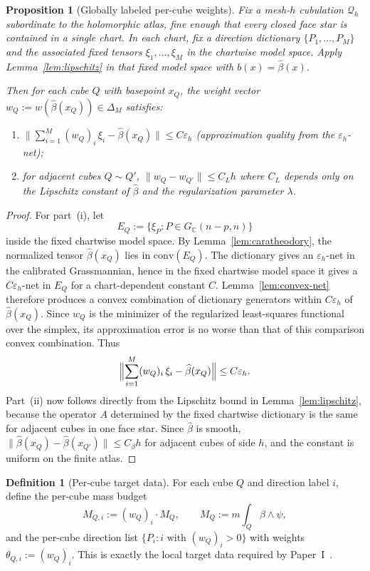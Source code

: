 \documentclass[11pt]{article}
\numberwithin{equation}{section}
\theoremstyle{plain}
\newtheorem{proposition}[theorem]{Proposition}
\theoremstyle{definition}
\newtheorem{definition}[theorem]{Definition}
\theoremstyle{remark}
\newcommand{\C}{\mathbb{C}}
\newcommand{\eps}{\varepsilon}
\newcommand{\calQ}{\mathcal{Q}}
\begin{document}
\begin{proposition}[Globally labeled per-cube weights]\label{prop:global-weights}
Fix a mesh-$h$ cubulation $\calQ_h$ subordinate to the holomorphic atlas, fine enough that every closed face star is contained in a single chart.  In each chart, fix a direction dictionary $\{P_1,\dots,P_M\}$ and the associated fixed tensors $\xi_1,\dots,\xi_M$ in the chartwise model space.  Apply Lemma~\ref{lem:lipschitz} in that fixed model space with $b(x)=\widehat\beta(x)$.

Then for each cube $Q$ with basepoint $x_Q$, the weight vector $w_Q:=w(\widehat\beta(x_Q))\in\Delta_M$ satisfies:
\begin{enumerate}
\item[\textnormal{(i)}] $\|\sum_{i=1}^M (w_Q)_i\,\xi_i-\widehat\beta(x_Q)\|\le C\eps_h$ (approximation quality from the $\eps_h$-net);
\item[\textnormal{(ii)}] for adjacent cubes $Q\sim Q'$, $\|w_Q-w_{Q'}\|\le C_L h$ where $C_L$ depends only on the Lipschitz constant of $\widehat\beta$ and the regularization parameter $\lambda$.
\end{enumerate}
\end{proposition}

\begin{proof}
For part~(i), let
\[
E_Q:=\{\xi_P:P\in G_\C(n-p,n)\}
\]
inside the fixed chartwise model space.
By Lemma~\ref{lem:caratheodory}, the normalized tensor $\widehat\beta(x_Q)$ lies in $\mathrm{conv}(E_Q)$.  The dictionary gives an $\eps_h$-net in the calibrated Grassmannian, hence in the fixed chartwise model space it gives a $C\eps_h$-net in $E_Q$ for a chart-dependent constant $C$.  Lemma~\ref{lem:convex-net} therefore produces a convex combination of dictionary generators within $C\eps_h$ of $\widehat\beta(x_Q)$.  Since $w_Q$ is the minimizer of the regularized least-squares functional over the simplex, its approximation error is no worse than that of this comparison convex combination.  Thus
\[
\Bigl\|\sum_{i=1}^M (w_Q)_i\,\xi_i-\widehat\beta(x_Q)\Bigr\|\le C\eps_h.
\]
Part~(ii) now follows directly from the Lipschitz bound in Lemma~\ref{lem:lipschitz}, because the operator $A$ determined by the fixed chartwise dictionary is the same for adjacent cubes in one face star.  Since $\widehat\beta$ is smooth, $\|\widehat\beta(x_Q)-\widehat\beta(x_{Q'})\|\le C_\beta h$ for adjacent cubes of side $h$, and the constant is uniform on the finite atlas.
\end{proof}

\begin{definition}[Per-cube target data]\label{def:target}
For each cube $Q$ and direction label $i$, define the per-cube mass budget
\[
M_{Q,i}:=(w_Q)_i\cdot M_Q,
\qquad
M_Q:=m\int_Q \beta\wedge\psi,
\]
and the per-cube direction list $\{P_i:i\text{ with }(w_Q)_i>0\}$ with weights $\theta_{Q,i}:=(w_Q)_i$.  This is exactly the local target data required by Paper~I~\cite[Thm.~1.1]{Washburn26I}.
\end{definition}
\end{document}
